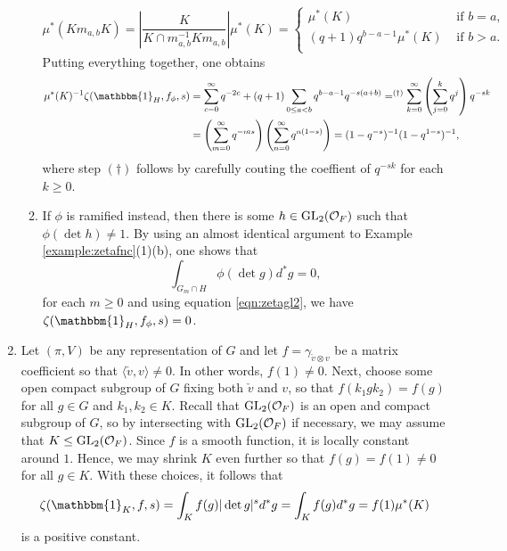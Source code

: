 \begin{example}
\begin{enumerate}[(1)]
\begin{enumerate}
            \[
            \mu^*(Km_{a,b}K)=\left|\frac{K}{K\cap m_{a,b}^{-1}K m_{a,b}}\right|\mu^*(K)=
            \begin{cases}
                \mu^*(K) &\text{ if } b=a,\\
                (q+1)q^{b-a-1}\mu^*(K) &\text{ if } b > a.\\
            \end{cases}
            \]
            Putting everything together, one obtains
            \begin{align*}
                \mu^*(K)^{-1}\zeta(\mathbbm{1}_H,f_\phi,s)&=\sum_{c=0}^{\infty}q^{-2c}+(q+1)\sum_{0\leq a< b}q^{b-a-1}q^{-s(a+b)}=^{(\dagger)}\sum_{k=0}^\infty\left(\sum_{j=0}^k q^j\right)q^{-sk}\\
                &=\left(\sum_{m=0}^\infty q^{-ms}\right)\left(\sum_{n=0}^\infty q^{n(1-s)}\right)=(1-q^{-s})^{-1}(1-q^{1-s})^{-1},
            \end{align*}
            where step $(\dagger)$ follows by carefully couting the coeffient of $q^{-sk}$ for each $k\geq 0$.
            \item If $\phi$ is ramified instead, then there is some $h\in \mathrm{GL}_2(\mathcal{O}_F)$ such that $\phi(\det h)\neq 1$. By using an almost identical argument to Example \ref{example:zetafnc}(1)(b), one shows that
            $$\int_{G_m\cap H}\phi(\det g)d^*g=0,$$
            for each $m\geq 0$ and using equation \eqref{eqn:zetagl2}, we have $\zeta(\mathbbm{1}_H,f_\phi,s)=0$.
        \end{enumerate} 
        
        \item Let $(\pi,V)$ be any representation of $G$ and let $f=\gamma_{\check{v}\otimes v}$ be a matrix coefficient so that $\langle\check{v},v\rangle\neq 0$. In other words, $f(1)\neq 0$. Next, choose some open compact subgroup of $G$ fixing both $\check{v}$ and $v$, so that $f(k_1gk_2)=f(g)$ for all $g\in G$ and $k_1,k_2\in K$. Recall that $\mathrm{GL}_2(\mathcal{O}_F)$ is an open and compact subgroup of $G$, so by intersecting with $\mathrm{GL}_2(\mathcal{O}_F)$ if necessary, we may assume that $K\leq\mathrm{GL}_2(\mathcal{O}_F)$. Since $f$ is a smooth function, it is locally constant around $1$. Hence, we may shrink $K$ even further so that $f(g)=f(1)\neq0$ for all $g\in K$. With these choices, it follows that 
        $$\zeta(\mathbbm{1}_K,f,s)=\int_{K}f(g)|\det g|^sd^*g=\int_K f(g)d^*g=f(1)\mu^*(K)$$ is a positive constant.
        

    \end{enumerate}
\end{example}

